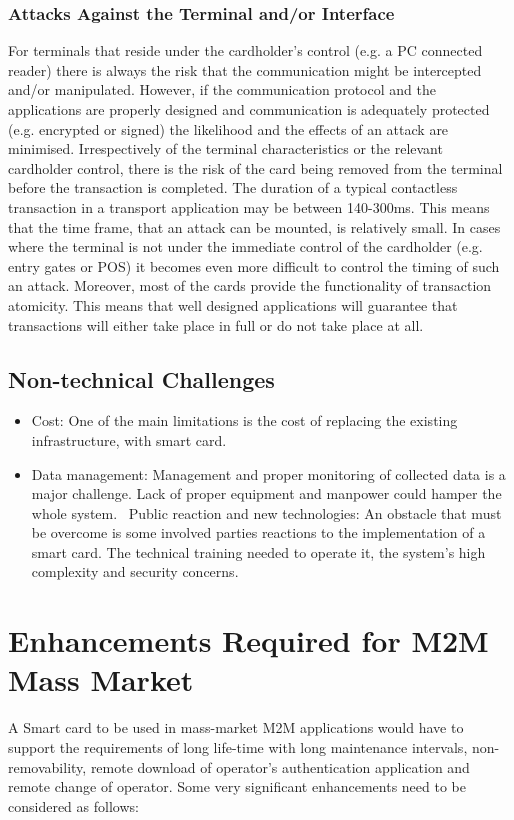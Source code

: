 \documentclass[12pt]{article}
\begin{document}
\subsubsection{Attacks Against the Terminal and/or
Interface}
For terminals that reside under the cardholder’s
control (e.g. a PC connected reader) there is always the
risk that the communication might be intercepted
and/or manipulated. However, if the communication
protocol and the applications are properly designed and
communication is adequately protected (e.g. encrypted
or signed) the likelihood and the effects of an attack
are minimised.\newline
Irrespectively of the terminal characteristics or the
relevant cardholder control, there is the risk of the card
being removed from the terminal before the transaction
is completed. The duration of a typical contactless
transaction in a transport application may be between
140-300ms. This means that the time frame, that an
attack can be mounted, is relatively small. In cases
where the terminal is not under the immediate control
of the cardholder (e.g. entry gates or POS) it becomes
even more difficult to control the timing of such an
attack. Moreover, most of the cards provide the
functionality of transaction atomicity. This means
that well designed applications will guarantee that
transactions will either take place in full or do not take
place at all.

\subsection{Non-technical Challenges}
\begin{itemize}
\item Cost: One of the main limitations is the cost of replacing the
existing infrastructure, with smart card. 
\item Data management: Management and proper monitoring of collected data is a major challenge. Lack of proper equipment and manpower could hamper the whole system.
\ Public reaction and new technologies: An obstacle that must be overcome is some involved
parties reactions to the implementation of a smart card.
The technical training needed to operate it, the system's high
complexity and security concerns.

\end{itemize}








\section{Enhancements Required for M2M Mass Market}
A Smart card to be used in mass-market M2M applications would have to support the requirements of long life-time with long maintenance intervals, non-removability, remote download of operator’s authentication application and remote change of operator. Some very significant enhancements need to be considered as follows:
\end{document}
